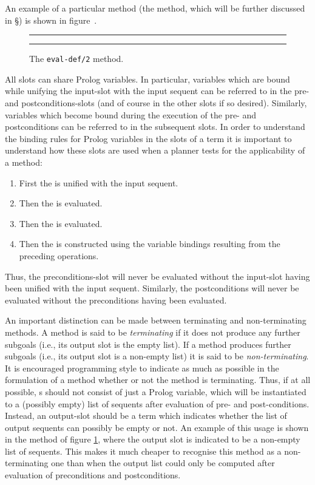 An example of a particular method (the  method, which
will be further discussed in \S{}) is shown
in figure~.

\begin{figure}[tb]
\hrule\vspace{1ex}
{\small
}
\caption{The {\tt eval-def/2} method.} 
\label{eval-def-fig}
\vspace{1ex} \hrule
\end{figure}

All slots can share Prolog variables. In particular, variables which
are bound while unifying the input-slot with the input sequent can be
referred to in the pre- and postconditions-slots (and of course in the
other slots if so desired). Similarly, variables which become bound
during the execution of the pre- and postconditions can be referred to
in the subsequent slots. In order to understand the binding rules for
Prolog variables in the slots of a  term it is important
to understand how these slots are used when a planner tests for the
applicability of a method: 
\begin{enumerate}
\item
First the  is unified with the input sequent.
\item
Then the  is evaluated.
\item
Then the  is evaluated.
\item
Then the  is constructed using the variable bindings
resulting from the preceding operations.
\end{enumerate}
Thus, the preconditions-slot will never be evaluated without the
input-slot having been unified with the input sequent. Similarly, the
postconditions will never be evaluated without the preconditions
having been evaluated.

An important distinction can be made between terminating and
non-terminating methods.  A method is said to
be {\em terminating\/} if it does not produce any further subgoals
(i.e., its output slot is the empty list). If a method produces
further subgoals (i.e., its output slot is a non-empty list) it is
said to be {\em non-terminating}. It is encouraged programming style
to indicate as much as possible in the formulation of a method whether
or not the method is terminating. Thus, if at all possible,
s should not consist of just a Prolog variable, which
will be instantiated to a (possibly empty) list of sequents after
evaluation of pre- and post-conditions. Instead, an output-slot should
be a term which indicates whether the list of output sequents can
possibly be empty or not. An example of this usage is shown in the
 method of figure \ref{eval-def-fig}, where the output
slot is indicated to be a non-empty list of sequents. This makes it
much cheaper to recognise this method as a non-terminating one than
when the output list could only be computed after evaluation of
preconditions and postconditions.

